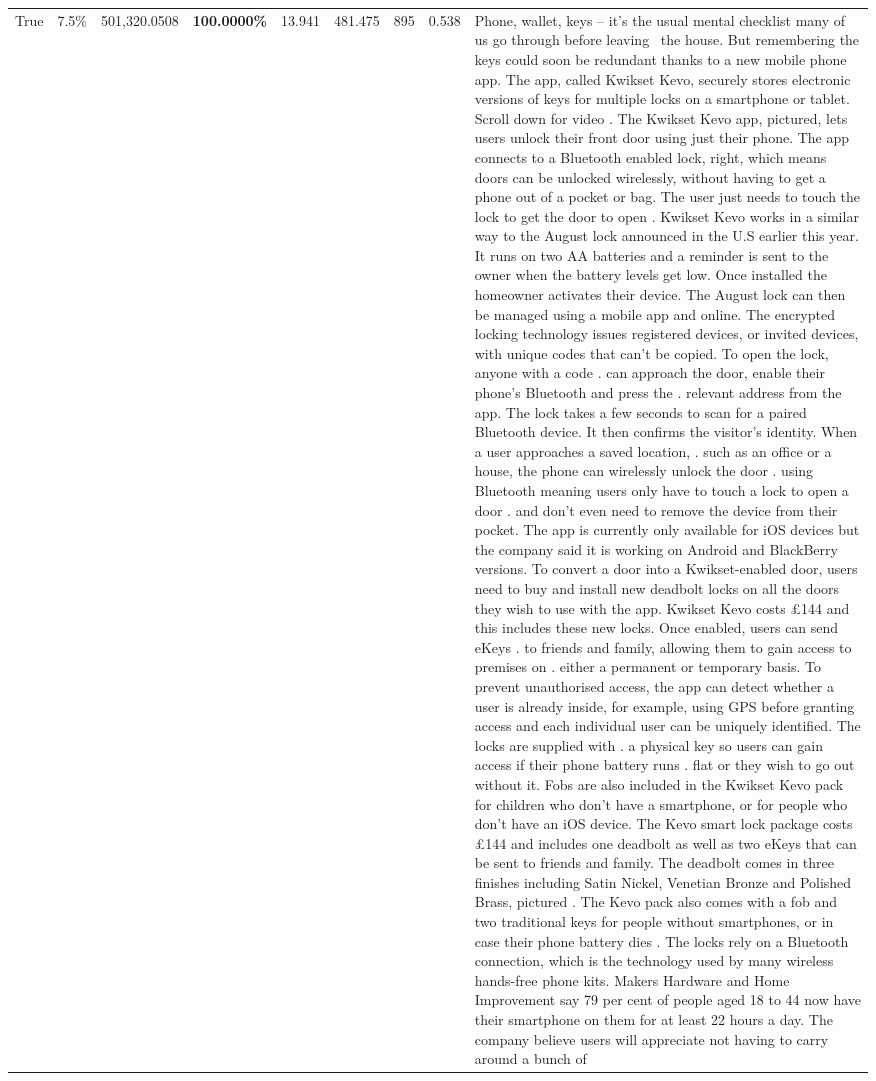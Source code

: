 \begin{table}[H]
\begin{tabular}{lllrlllll}
True & 7.5\% & 501,320.0508 & \bfseries \color{red} 100.0000\% & 13.941 & 481.475 & 895 & 0.538 & Phone, wallet, keys – it’s the usual mental checklist many of us go through before leaving  the house. But remembering the keys could soon be redundant thanks to a new mobile phone app. The app, called Kwikset Kevo, securely stores electronic versions of keys for multiple locks on a smartphone or tablet. Scroll down for video . The Kwikset Kevo app, pictured, lets users unlock their front door using just their phone. The app connects to a Bluetooth enabled lock, right, which means doors can be unlocked wirelessly, without having to get a phone out of a pocket or bag. The user just needs to touch the lock to get the door to open . Kwikset Kevo works in a similar way to the August lock announced in the U.S earlier this year. It runs on two AA batteries and a reminder is sent to the owner when the battery levels get low. Once installed the homeowner activates their device. The August lock can then be managed using a mobile app and online. The encrypted locking technology issues registered devices, or invited devices, with unique codes that can't be copied. To open the lock, anyone with a code . can approach the door, enable their phone's Bluetooth and press the . relevant address from the app. The lock takes a few seconds to scan for a paired Bluetooth device. It then confirms the visitor's identity. When a user approaches a saved location, . such as an office or a house, the phone can wirelessly unlock the door . using Bluetooth meaning users only have to touch a lock to open a door . and don't even need to remove the device from their pocket. The app is currently only available for iOS devices but the company said it is working on Android and BlackBerry versions. To convert a door into a Kwikset-enabled door, users need to buy and install new deadbolt locks on all the doors they wish to use with the app. Kwikset Kevo costs £144 and this includes these new locks. Once enabled, users can send eKeys . to friends and family, allowing them to gain access to premises on . either a permanent or temporary basis. To prevent unauthorised access, the app can detect whether a user is already inside, for example, using GPS before granting access and each individual user can be uniquely identified. The locks are supplied with . a physical key so users can gain access if their phone battery runs . flat or they wish to go out without it. Fobs are also included in the Kwikset Kevo pack for children who don't have a smartphone, or for people who don't have an iOS device. The Kevo smart lock package costs £144 and includes one deadbolt as well as two eKeys that can be sent to friends and family. The deadbolt comes in three finishes including Satin Nickel, Venetian Bronze and Polished Brass, pictured . The Kevo pack also comes with a fob and two traditional keys for people without smartphones, or in case their phone battery dies . The locks rely on a Bluetooth connection, which is the technology used by many wireless hands-free phone kits. Makers Hardware and Home Improvement say 79 per cent of people aged 18 to 44 now have their smartphone on them for at least 22 hours a day. The company believe users will appreciate not having to carry around a bunch of 
\end{tabular}
\end{table}
